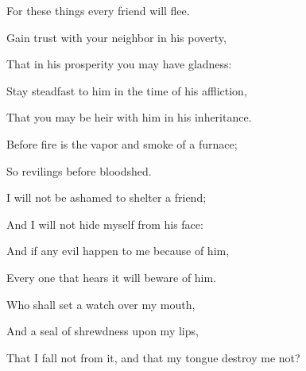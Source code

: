 {\par }{\Q For these things every friend will flee.
\par }{\BB \par }{\Q {}Gain trust with your neighbor in his poverty,
\par }{\Q That in his prosperity you may have gladness:
\par }{\Q Stay steadfast to him in the time of his affliction,
\par }{\Q That you may be heir with him in his inheritance.
\par }{\Q {}Before fire is the vapor and smoke of a furnace;
\par }{\Q So revilings before bloodshed.
\par }{\Q {}I will not be ashamed to shelter a friend;
\par }{\Q And I will not hide myself from his face:
\par }{\Q {}And if any evil happen to me because of him,
\par }{\Q Every one that hears it will beware of him.
\par }{\BB \par }{\Q {}Who shall set a watch over my mouth,
\par }{\Q And a seal of shrewdness upon my lips,
\par }{\Q That I fall not from it, and that my tongue destroy me not?

}
